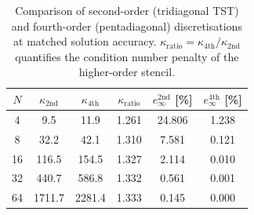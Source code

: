 \begin{table}[htbp]
  \centering
  \caption{Comparison of second-order (tridiagonal TST) and fourth-order (pentadiagonal) discretisations at matched solution accuracy. $\kappa_\mathrm{ratio} = \kappa_\mathrm{4th} / \kappa_\mathrm{2nd}$ quantifies the condition number penalty of the higher-order stencil.}
  \label{tab:order_comparison}
  \begin{tabular}{S[table-format=2.0] S[table-format=4.1] S[table-format=4.1] S[table-format=1.3] S[table-format=3.3] S[table-format=3.3]}
    \toprule
    {$N$} & {$\kappa_\mathrm{2nd}$} & {$\kappa_\mathrm{4th}$} & {$\kappa_\mathrm{ratio}$} & {$e_\infty^\mathrm{2nd}$ [\%]} & {$e_\infty^\mathrm{4th}$ [\%]} \\
     & 9.5 & 11.9 & 1.261 & 24.806 & 1.238 \\
    8 & 32.2 & 42.1 & 1.310 & 7.581 & 0.121 \\
    16 & 116.5 & 154.5 & 1.327 & 2.114 & 0.010 \\
    32 & 440.7 & 586.8 & 1.332 & 0.561 & 0.001 \\
    64 & 1711.7 & 2281.4 & 1.333 & 0.145 & 0.000 \\
    \bottomrule
  \end{tabular}
\end{table}
